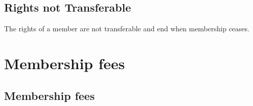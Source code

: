 \documentclass[../constitution.tex]{subfiles}
\begin{document}
\subsection{Rights not Transferable} \label{rights-not-transferable}

The rights of a member are not transferable and end when membership ceases.


\section{Membership fees} \label{division-2-membership-fees}

\subsection{Membership fees} \label{membership-fees}
\end{document}
